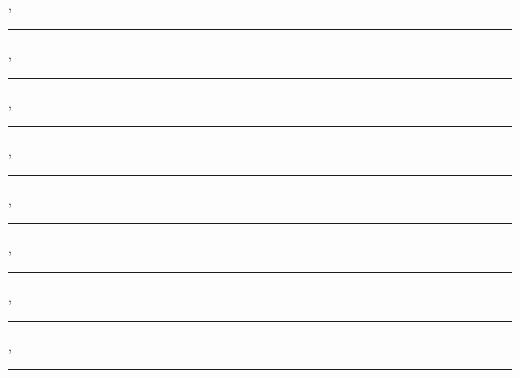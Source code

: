 \begin{minipage}{0.45\textwidth}
\centering
{ \advisor\\ \advisorUni \\ \advisorT }
\end{minipage}
\ifnum{}
\hfill
\begin{minipage}{0.45\textwidth}
\centering
{ \coadvisor\\ \coadvisorUni \\ \coadvisorT }
\end{minipage}
\fi

\vspace*{2cm}

{{\bfseries \signmember}}

\ifnum{}
{ \advisor, \advisorT \\ \advisorUni \hfill\rule{5cm}{1pt} }

{ \memberi, \memberT \\ \memberiUni \hfill\rule{5cm}{1pt} }

{ \memberii, \memberT \\ \memberiiUni \hfill\rule{5cm}{1pt} }

{ \memberiii, \memberT \\ \memberiiiUni \hfill\rule{5cm}{1pt} }

{ \memberiv, \memberT \\ \memberivUni \hfill\rule{5cm}{1pt} }

\else

{ \advisor, \advisorT \\ \advisorUni \hfill\rule{5cm}{1pt} }

{ \memberi, \memberT \\ \memberiUni \hfill\rule{5cm}{1pt} }

{ \memberii, \memberT \\ \memberiiUni \hfill\rule{5cm}{1pt} }

\fi
\fi


